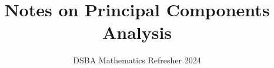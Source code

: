 \documentclass[]{article}
\title{Notes on Principal Components Analysis}
\author{DSBA Mathematics Refresher 2024}
\date{}
\begin{document}
	
	\maketitle
	
	\begin{abstract}
		
	\end{abstract}
	
	
	
\end{document}
